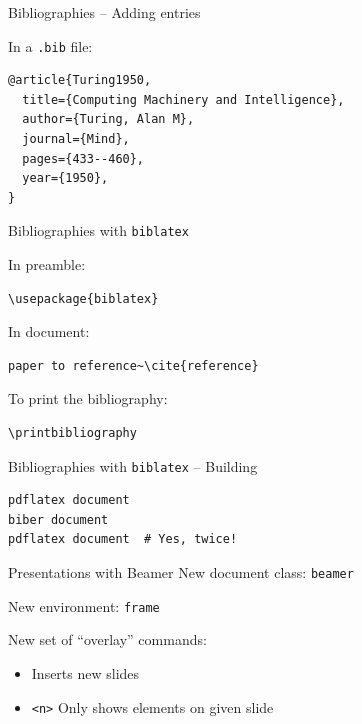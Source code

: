\documentclass[t]{beamer}
\begin{document}
\begin{frame}[fragile]{Bibliographies -- Adding entries}

  In a \texttt{.bib} file:

  \begin{verbatim}
@article{Turing1950,
  title={Computing Machinery and Intelligence},
  author={Turing, Alan M},
  journal={Mind},
  pages={433--460},
  year={1950},
}
  \end{verbatim}

\end{frame}

\begin{frame}[fragile]{Bibliographies with \texttt{biblatex}}

  In preamble:

  \begin{verbatim}
\usepackage{biblatex}

  \end{verbatim}
  \vfill

  In document:

  \begin{verbatim}
paper to reference~\cite{reference}
  \end{verbatim}
  \vfill

  To print the bibliography:

  \begin{verbatim}
\printbibliography
  \end{verbatim}
\end{frame}

\begin{frame}[fragile]{Bibliographies with \texttt{biblatex} -- Building}
  \begin{verbatim}
pdflatex document
biber document
pdflatex document  # Yes, twice!
  \end{verbatim}
\end{frame}

\begin{frame}{Presentations with Beamer}
  New document class: \texttt{beamer}
  \pause

  New environment: \texttt{frame}
  \pause

  New set of ``overlay'' commands:
  \begin{itemize}[<+->]
    \item \texttt{\pause} Inserts new slides
    \item \texttt{\only<n>} Only shows elements on given slide
  \end{itemize}
\end{frame}
\end{document}
